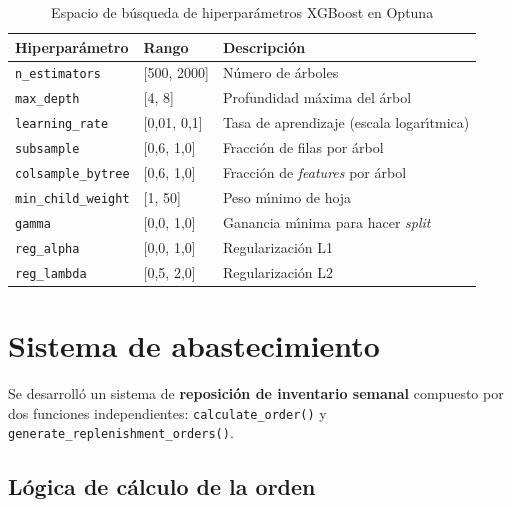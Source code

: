\documentclass[12pt, a4paper, oneside]{report}
\newcommand{\code}[1]{\texttt{\small\color{codeblue}#1}}
\begin{document}
\begin{table}[H]
  \centering
  \caption{Espacio de b\'usqueda de hiperpar\'ametros XGBoost en Optuna}
  \label{tab:optuna_space}
  \begin{tabularx}{\textwidth}{L{3.8cm} C{3cm} X}
    \toprule
    {\color{white}\textbf{Hiperpar\'ametro}} &
    {\color{white}\textbf{Rango}} &
    {\color{white}\textbf{Descripci\'on}} \\
    \midrule
       \code{n\_estimators}       & [500, 2000]  & N\'umero de \'arboles \\
      \code{max\_depth}          & [4, 8]       & Profundidad m\'axima del \'arbol \\
       \code{learning\_rate}      & [0,01, 0,1]  & Tasa de aprendizaje (escala logar\'{\i}tmica) \\
      \code{subsample}           & [0,6, 1,0]   & Fracci\'on de filas por \'arbol \\
       \code{colsample\_bytree}   & [0,6, 1,0]   & Fracci\'on de \textit{features} por \'arbol \\
      \code{min\_child\_weight}  & [1, 50]      & Peso m\'{\i}nimo de hoja \\
       \code{gamma}               & [0,0, 1,0]   & Ganancia m\'{\i}nima para hacer \textit{split} \\
      \code{reg\_alpha}          & [0,0, 1,0]   & Regularizaci\'on L1 \\
       \code{reg\_lambda}         & [0,5, 2,0]   & Regularizaci\'on L2 \\
    \bottomrule
  \end{tabularx}
\end{table}

\section{Sistema de abastecimiento}

Se desarroll\'o un sistema de \textbf{reposici\'on de inventario semanal} compuesto por dos funciones independientes: \code{calculate\_order()} y \code{generate\_replenishment\_orders()}.

\subsection{L\'ogica de c\'alculo de la orden}
\end{document}
